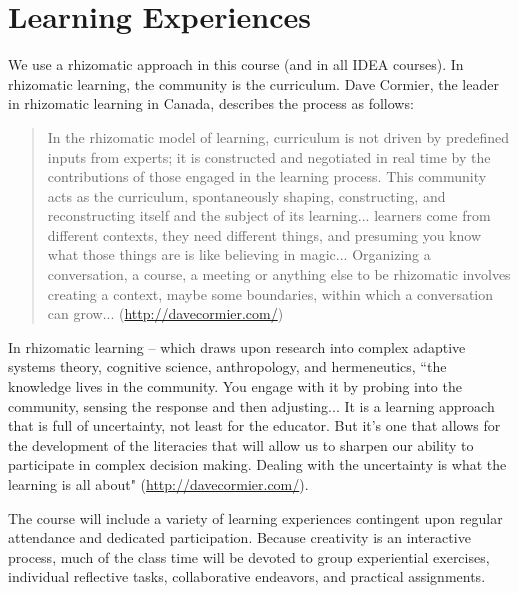 \documentclass[letterpaper,10pt,headsepline]{scrreprt}
\begin{document}
\section{Learning Experiences}

We use a rhizomatic approach in this course (and in all IDEA courses). In rhizomatic learning, the community is the curriculum. Dave Cormier, the leader in rhizomatic learning in Canada, describes the process as follows:

\begin{quote}
In the rhizomatic model of learning, curriculum is not driven by predefined inputs from experts; it is constructed and negotiated in real time by the contributions of those engaged in the learning process. This community acts as the curriculum, spontaneously shaping, constructing, and reconstructing itself and the subject of its learning... learners come from different contexts, they need different things, and presuming you know what those things are is like believing in magic... Organizing a conversation, a course, a meeting or anything else to be rhizomatic involves creating a context, maybe some boundaries, within which a conversation can grow... (\url{http://davecormier.com/})
\end{quote}

In rhizomatic learning -- which draws upon research into complex adaptive systems theory, cognitive science, anthropology, and hermeneutics, ``the knowledge lives in the community. You engage with it by probing into the community, sensing the response and then adjusting... It is a learning approach that is full of uncertainty, not least for the educator. But it's one that allows for the development of the literacies that will allow us to sharpen our ability to participate in complex decision making. Dealing with the uncertainty is what the learning is all about"  (\url{http://davecormier.com/}).

The course will include a variety of learning experiences contingent upon regular attendance and dedicated participation. Because creativity is an interactive process, much of the class time will be devoted to group experiential exercises, individual reflective tasks, collaborative endeavors, and practical assignments.
\end{document}
